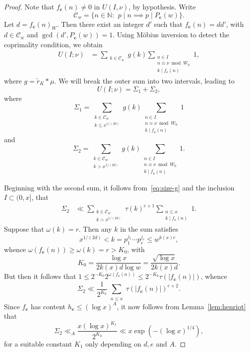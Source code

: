 \documentclass[10pt,a4paper]{amsart}
\renewcommand{\c}{\mathbf{c}}
\renewcommand{\geq}{\geqslant}
\renewcommand{\leq}{\leqslant}
\begin{document}
\begin{proof}
 Note that $f_\c(n)\neq 0$ in $U(I,\nu)$, by hypothesis.
 Write 
 $$\mathcal{C}_w=\{n\in \mathbb{N}:\,\ p\mid n\implies p\mid P_\c(w)\}.$$
Let $d=f_\c(n)_W$.  Then there exist an integer $d'$ such that $f_\c(n)=dd'$, with 
$d\in \mathcal{C}_w$ and 
$\gcd(d',P_\c(w))=1$. 
Using M\"obius inversion to detect the coprimality condition, we obtain
\begin{align*}
U(I;\nu)
&=\sum_{\substack{k\in \mathcal{C}_w
}} g(k)
\sum_{\substack{n\in I
\\ n\equiv \nu\bmod{W_0}\\ 
k\mid f_\c(n)}} 1,
\end{align*}
where 
$
g=\tilde r_K* \mu$.
We will  break the outer  sum into two intervals, leading to 
\begin{equation}\label{eq:sum-sig123'}
U(I;\nu)=\Sigma_1+\Sigma_2,
\end{equation}
where
\begin{equation}\label{eq:Sigma1'}
\Sigma_1=
\sum_{\substack{k\in \mathcal{C}_w 
\\ k\leq x^{1/(2d)}}} g(k) 	
\sum_{\substack{n\in I
\\ n\equiv \nu\bmod{W_0}\\
k\mid f_\c(n)}} 1
\end{equation}
and 
$$
\Sigma_2=
\sum_{\substack{k\in \mathcal{C}_w 
\\ 
k>x^{1/(2d)}}} 
g(k) 	
\sum_{\substack{n\in I
\\ n\equiv \nu\bmod{W_0}\\
k\mid f_\c(n)}} 1.
$$


Beginning with the second sum, it follows from~\eqref{eq:size-g} and the inclusion  $I\subset (0,x]$, that 
\begin{align*}
\Sigma_2
&\ll
\sum_{\substack{k\in \mathcal{C}_w 
\\ 
k>x^{1/(2d)}}}
\tau(k)^{e+1}
\sum_{\substack{n\leq x\\ k\mid f_\c(n)}} 1.
\end{align*}
Suppose that $\omega(k)=r$. Then any $k$ in the sum satisfies
$$
x^{1/(2d)}<k=p_1^{j_1}\cdots p_{r}^{j_r}\leq w^{k(x)r},
$$
whence $\omega(f_\c(n))\geq \omega(k)=r > K_0$, with 
$$
K_0=\frac{\log x}{2 k(x)d\log w}=\frac{\sqrt{\log x}}{2k(x)d}.
$$
But then it follows that $1\leq 2^{-K_0} 2^{\omega(f_\c(n))}\leq 2^{-K_0} \tau(|f_\c(n)|)$, whence
$$
\Sigma_2
\ll
\frac{1}{2^{K_0}} 
\sum_{\substack{n\leq x}} \tau(|f_\c(n)|)^{e+2}.
$$
Since $f_\c$ has content  $h_\c\leq (\log x)^A$, 
it now follows from Lemma~\ref{lem:henriot} that 
\begin{equation}\label{eq:Sigma2-''}
\Sigma_2
\ll_A
\frac{x(\log x)^{K_1}}{2^{K_0}} 
\ll x\exp\left(-(\log x)^{1/4}\right),
\end{equation}
for a suitable constant $K_1$ only depending on $d,e$ and $A$.




\end{proof}
\end{document}
